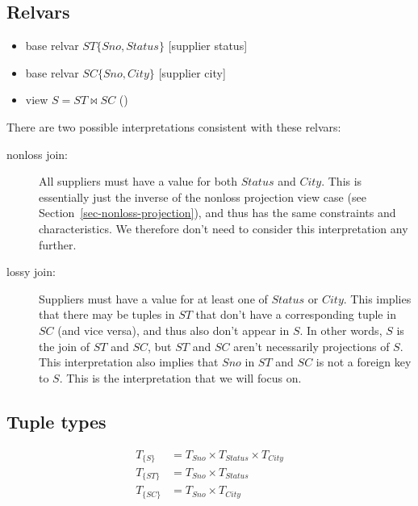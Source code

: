 \documentclass{article}
\newcommand{\RelJoin}{\ensuremath{\Join}}
\newcounter{constraint}
\newcommand{\identifier}[1]{\ensuremath{\mathit{#1}}}
\newcommand{\ST}{\identifier{ST}}
\newcommand{\SC}{\identifier{SC}}
\newcommand{\Sno}{\identifier{Sno}}
\newcommand{\Status}{\identifier{Status}}
\newcommand{\City}{\identifier{City}}
\newcommand{\Type}[1]{\ensuremath{T_{#1}}}
\newcommand{\TT}[1]{\ensuremath{T_{\{#1\}}}}
\newcommand{\eqnnumber}{\refstepcounter{equation}(\theequation)}
\begin{document}
\subsection{Relvars}
\begin{itemize}
    \item base relvar \(\ST\{\Sno, \Status\}\) [supplier status]
    \item base relvar \(\SC\{\Sno, \City\}\) [supplier city]
    \item view \(S = \ST \RelJoin \SC\) \eqnnumber\label{eqn-s-join-one}
\end{itemize}
There are two possible interpretations consistent with these relvars:
\begin{description}
    \item[nonloss join:] All suppliers must have a value for both \(\Status\) and \(\City\). This is essentially just the inverse of the nonloss projection view case (see Section~\ref{sec-nonloss-projection}), and thus has the same constraints and characteristics. We therefore don't need to consider this interpretation any further.
    
    \item[lossy join:] Suppliers must have a value for at least one of \(\Status\) or \(\City\). This implies that there may be tuples in \(\ST\) that don't have a corresponding tuple in \(\SC\) (and vice versa), and thus also don't appear in \(S\). In other words, \(S\) is the join of \(\ST\) and \(\SC\), but \(\ST\) and \(\SC\) aren't necessarily projections of \(S\). This interpretation also implies that \(\Sno\) in \(\ST\) and \(\SC\) is not a foreign key to \(S\). This is the interpretation that we will focus on.
\end{description}




\subsection{Tuple types}
\begin{align}
    \TT{S}   &= \Type{\Sno} \times \Type{\Status} \times \Type{\City} \nonumber   \\
    \TT{\ST} &= \Type{\Sno} \times \Type{\Status} \nonumber    \\
    \TT{\SC} &= \Type{\Sno} \times \Type{\City} \nonumber
\end{align}


\end{document}

